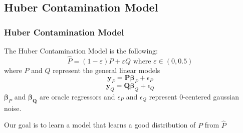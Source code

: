 \documentclass[
11pt, %
serif
]{beamer}
\begin{document}
	
	\subsection{Huber Contamination Model}
	
	\begin{frame}
		\frametitle{Huber Contamination Model}
		
		\begin{Problem}
			The \alert{Huber Contamination Model} is the following:
			\begin{equation*}
				\hat{P} = (1-\varepsilon)P + \varepsilon Q \text{ where } \varepsilon \in (0,0.5)
			\end{equation*}
			where $P$ and $Q$ represent the general linear models
			\begin{equation*}
				\boldsymbol{y}_P = \mathbf{P}\boldsymbol{\beta}_P  + \epsilon_P 
			\end{equation*}
			\begin{equation*}
				\boldsymbol{y}_Q = \mathbf{Q} \boldsymbol{\beta}_Q + \epsilon_Q
			\end{equation*}
			$\boldsymbol{\beta}_P$ and $\boldsymbol{\beta_Q}$ are  oracle regressors and $\epsilon_P$ and $\epsilon_Q$ represent $0$-centered gaussian noise. 
		\end{Problem}
		
		Our goal is to learn a model that learns a good distribution of $P$ from $\hat{P}$
		
		\bigskip %
		
	\end{frame}
	
	
\end{document}
